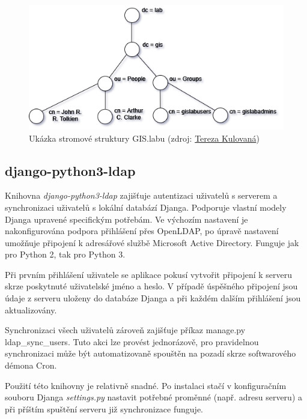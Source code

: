 \begin{figure}[H] \centering
      \includegraphics[width=400pt]{./pictures/gislab-ldap_dit.png}
      \caption[Ukázka stromové struktury GIS.labu]{Ukázka stromové struktury GIS.labu (zdroj:
	  \href{}{Tereza Kulovaná})}
      \label{fig:gislab-dit}
\end{figure}

\subsection{django-python3-ldap}
Knihovna \textit{django-python3-ldap} zajišťuje autentizaci uživatelů
s  serverem a synchronizaci  uživatelů s lokální
databází Djanga. Podporuje vlastní modely Djanga upravené specifickým
potřebám. Ve výchozím nastavení je nakonfigurována podpora přihlášení
přes OpenLDAP, po úpravě nastavení umožňuje připojení k adresářové
službě Microsoft Active Directory. Funguje jak pro Python 2, tak pro
Python 3.

Při prvním přihlášení uživatele se aplikace pokusí vytvořit připojení
k  serveru skrze poskytnuté uživatelské jméno a heslo. V
případě úspěšného připojení jsou údaje z  serveru uloženy do
databáze Djanga a při každém dalším přihlášení jsou aktualizovány.

Synchronizaci všech uživatelů zároveň zajišťuje příkaz
\textsf{manage.py ldap\_sync\_users}. Tuto akci lze provést
jednorázově, pro pravidelnou synchronizaci může být automatizovaně
spouštěn na pozadí skrze softwarového démona Cron.

Použití této knihovny je relativně snadné. Po instalaci stačí v
konfiguračním souboru Djanga \textit{settings.py} nastavit potřebné
proměnné (např.  adresu  serveru) a při příštím
spuštění serveru již synchronizace funguje.

